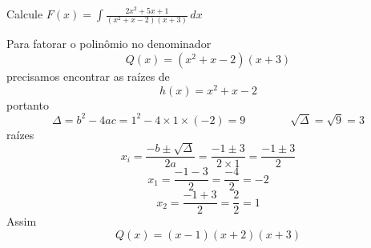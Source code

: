 \documentclass[a4paper,12pt,fleqn]{article}
\begin{document}


Calcule
\(
  F(x) = \int \frac{2x^2+5x+1}{(x^2 + x -2)(x+3)}\,dx
\)

\begin{answer}
Para fatorar o polinômio no denominador
\[
  Q(x) = (x^2 + x -2)(x+3)
\]
precisamos encontrar as raízes de
\[
  h(x) = x^2 + x -2
\]
portanto
\[
  \Delta
  = b^2 - 4 a c
  = 1^2 - 4 \times 1 \times (-2)
  = 9
  \qquad\qquad
  \sqrt{\Delta}
  =\sqrt{9}
  = 3
\]
raízes
\[
  x_i
  = \frac{-b\pm\sqrt{\Delta}}{2a}
  = \frac{-1\pm 3}{2\times 1}
  = \frac{-1\pm 3}{2}
\]
\[
  x_1
  = \frac{-1-3}{2}
  = \frac{-4}{2}
  = -2
\]
\[
  x_2
  = \frac{-1+3}{2}
  = \frac{2}{2}
  = 1
\]
Assim
\[
  Q(x) = (x-1)(x+2)(x+3)
\]


\end{answer}
\end{document}
